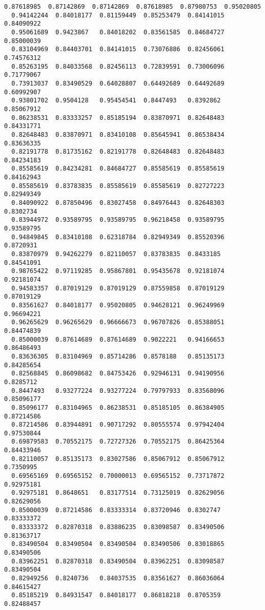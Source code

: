 \documentclass[11pt]{article}
\begin{document}
\begin{Verbatim}[commandchars=\\\{\}]
  0.87618985  0.87142869  0.87142869  0.87618985  0.87980753  0.95020805
  0.94142244  0.84018177  0.81159449  0.85253479  0.84141015  0.84090922
  0.95061689  0.9423867   0.84018202  0.83561585  0.84684727  0.85000039
  0.83104969  0.84403701  0.84141015  0.73076886  0.82456061  0.74576312
  0.85263195  0.84033568  0.82456113  0.72839591  0.73006096  0.71779067
  0.73913037  0.83490529  0.64028807  0.64492689  0.64492689  0.60992907
  0.93801702  0.9504128   0.95454541  0.8447493   0.8392862   0.85067912
  0.86238531  0.83333257  0.85185194  0.83870971  0.82648483  0.84331771
  0.82648483  0.83870971  0.83410108  0.85645941  0.86538434  0.83636335
  0.82191778  0.81735162  0.82191778  0.82648483  0.82648483  0.84234183
  0.85585619  0.84234281  0.84684727  0.85585619  0.85585619  0.84162943
  0.85585619  0.83783835  0.85585619  0.85585619  0.82727223  0.82949349
  0.84090922  0.87850496  0.83027458  0.84976443  0.82648303  0.8302734
  0.83944972  0.93589795  0.93589795  0.96218458  0.93589795  0.93589795
  0.94849845  0.83410108  0.62318784  0.82949349  0.85520396  0.8720931
  0.83870979  0.94262279  0.82110057  0.83783835  0.8433185   0.84541091
  0.98765422  0.97119285  0.95867801  0.95435678  0.92181074  0.92181074
  0.94583357  0.87019129  0.87019129  0.87559858  0.87019129  0.87019129
  0.83561627  0.84018177  0.95020805  0.94628121  0.96249969  0.96694221
  0.96265629  0.96265629  0.96666673  0.96707826  0.85388051  0.84474839
  0.85000039  0.87614689  0.87614689  0.9022221   0.94166653  0.86486493
  0.83636305  0.83104969  0.85714286  0.8578188   0.85135173  0.84285654
  0.82568845  0.86098682  0.84753426  0.92946131  0.94190956  0.8285712
  0.8447493   0.93277224  0.93277224  0.79797933  0.83568096  0.85096177
  0.85096177  0.83104965  0.86238531  0.85185105  0.86384905  0.87214586
  0.87214586  0.83944891  0.90717292  0.80555574  0.97942404  0.97530844
  0.69879583  0.70552175  0.72727326  0.70552175  0.86425364  0.84433946
  0.82110057  0.85135173  0.83027586  0.85067912  0.85067912  0.7350995
  0.69565169  0.69565152  0.70000013  0.69565152  0.73717872  0.92975181
  0.92975181  0.8648651   0.83177514  0.73125019  0.82629056  0.82629056
  0.85000039  0.87214586  0.83333314  0.83720946  0.8302747   0.83333372
  0.83333372  0.82870318  0.83886235  0.83098587  0.83490506  0.81363717
  0.83490504  0.83490504  0.83490504  0.83490506  0.83018865  0.83490506
  0.83962251  0.82870318  0.83490504  0.83962251  0.83098587  0.83490504
  0.82949256  0.8240736   0.84037535  0.83561627  0.86036064  0.84615427
  0.85185219  0.84931547  0.84018177  0.86818218  0.8705359   0.82488457

\end{Verbatim}
\end{document}
